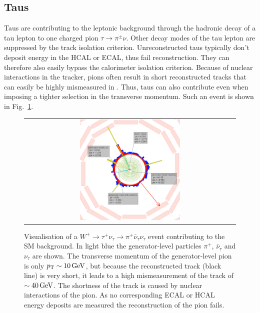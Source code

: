 \subsection*{Taus}
Taus are contributing to the leptonic background through the hadronic decay of a tau lepton to one charged pion $\tau\rightarrow\pi^{\pm}\nu$.
Other decay modes of the tau lepton are suppressed by the track isolation criterion.
Unreconstructed taus typically don't deposit energy in the HCAL or ECAL, thus fail reconstruction.
They can therefore also easily bypass the calorimeter isolation criterion.
Because of nuclear interactions in the tracker, pions often result in short reconstructed tracks that can easily be highly mismeasured in \pt.
Thus, taus can also contribute even when imposing a tighter selection in the transverse momentum.
Such an event is shown in Fig.~\ref{fig:LostTau}.  
\begin{figure}[!tb]
  \centering 
  \begin{tabular}{c}
    \includegraphics[width=0.49\textwidth]{figures/analysis/Background/LostTau_lumi_20940_event_8369426.png}
  \end{tabular}
  \caption{Visualisation of a $W^{+}\rightarrow \tau^{+}\nu_{\tau} \rightarrow \pi^{+}\bar{\nu}_{\tau} \nu_{\tau} $ event contributing to the SM background. 
           In light blue the generator-level particles $\pi^{+}$, $\bar{\nu}_{\tau}$ and $\nu_{\tau}$ are shown.
           The transverse momentum of the generator-level pion is only $p_{\text{T}}\sim10\,\text{Ge}\kern-0.06667em\text{V}$, but because the reconstructed track (black line) is very short, it leads to a high mismeasurement of the track \pt of $\sim40\,\text{Ge}\kern-0.06667em\text{V}$.
           The shortness of the track is caused by nuclear interactions of the pion.
           As no corresponding ECAL or HCAL energy deposits are measured the reconstruction of the pion fails.}
  \label{fig:LostTau}
\end{figure}

